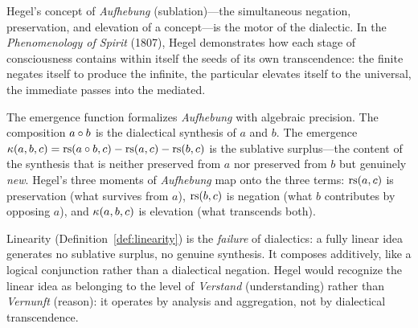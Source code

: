 \begin{interpretation}\label{interp:ch5:hegel_aufhebung}
Hegel's concept of \emph{Aufhebung} (sublation)---the simultaneous
negation, preservation, and elevation of a concept---is the motor of the
dialectic. In the \emph{Phenomenology of Spirit} (1807), Hegel demonstrates
how each stage of consciousness contains within itself the seeds of its
own transcendence: the finite negates itself to produce the infinite, the
particular elevates itself to the universal, the immediate passes into
the mediated.

The emergence function formalizes \emph{Aufhebung} with algebraic
precision. The composition $a \circ b$ is the dialectical synthesis of
$a$ and $b$. The emergence $\kappa(a, b, c) = \mathrm{rs}(a \circ b, c)
- \mathrm{rs}(a, c) - \mathrm{rs}(b, c)$ is the sublative surplus---the content of the
synthesis that is neither preserved from $a$ nor preserved from $b$ but
genuinely \emph{new}. Hegel's three moments of \emph{Aufhebung} map
onto the three terms: $\mathrm{rs}(a, c)$ is preservation (what survives from
$a$), $\mathrm{rs}(b, c)$ is negation (what $b$ contributes by opposing $a$),
and $\kappa(a, b, c)$ is elevation (what transcends both).

Linearity (Definition~\ref{def:linearity}) is the \emph{failure} of
dialectics: a fully linear idea generates no sublative surplus, no
genuine synthesis. It composes additively, like a logical conjunction
rather than a dialectical negation. Hegel would recognize the linear
idea as belonging to the level of \emph{Verstand} (understanding)
rather than \emph{Vernunft} (reason): it operates by analysis and
aggregation, not by dialectical transcendence.
\end{interpretation}

